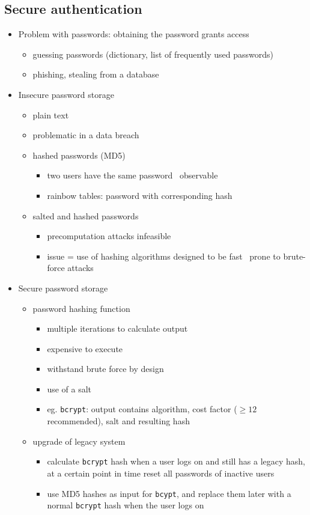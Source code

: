 \documentclass[12pt,titlepage,a4paper]{report}
\begin{document}
	\subsection{Secure authentication}
	 \begin{itemize}
	 	\item Problem with passwords: obtaining the password grants access
	 	\begin{itemize}
	 		\item guessing passwords (dictionary, list of frequently used passwords)
	 		\item phishing, stealing from a database
	 	\end{itemize}
 		\item Insecure password storage
 		\begin{itemize}
 			\item plain text
 			\item problematic in a data breach
 			\item hashed passwords (MD5)
 			\begin{itemize}
 				\item two users have the same password \textrightarrow \, observable
 				\item rainbow tables: password with corresponding hash
 			\end{itemize}
 			\item salted and hashed passwords
 			\begin{itemize}
 				\item precomputation attacks infeasible
 				\item issue = use of hashing algorithms
 					\subitem designed to be fast \textrightarrow \, prone to brute-force attacks
 			\end{itemize}
 		\end{itemize}
 		
 		\item Secure password storage
 		\begin{itemize}
 			\item password hashing function
 			\begin{itemize}
				\item multiple iterations to calculate output
 				\item expensive to execute
 				\item withstand brute force by design
 				\item use of a salt
 				\item eg. \texttt{bcrypt}: output contains algorithm, cost factor ($\geq 12$ recommended), salt and resulting hash
 			\end{itemize}
 			\item upgrade of legacy system
 			\begin{itemize}
 				\item calculate \texttt{bcrypt} hash when a user logs on and still has a legacy hash, at a certain point in time reset all passwords of inactive users
 				\item use MD5 hashes as input for \texttt{bcypt}, and replace them later with a normal \texttt{bcrypt} hash when the user logs on
 			\end{itemize}
 		\end{itemize}
 	

\end{itemize}
\end{document}
